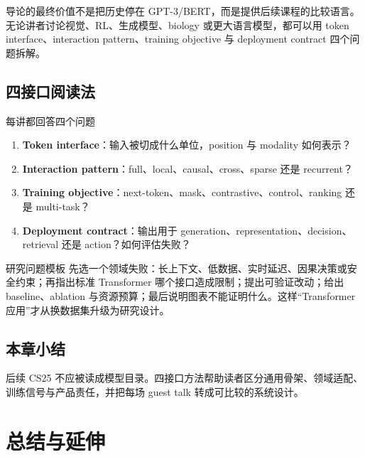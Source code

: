 \documentclass[a4paper]{article}
\begin{document}
导论的最终价值不是把历史停在 GPT-3/BERT，而是提供后续课程的比较语言。无论讲者讨论视觉、RL、生成模型、biology 或更大语言模型，都可以用 token interface、interaction pattern、training objective 与 deployment contract 四个问题拆解。

\subsection{四接口阅读法}

\begin{importantbox}{每讲都回答四个问题}
\begin{enumerate}
  \item \textbf{Token interface}：输入被切成什么单位，position 与 modality 如何表示？
  \item \textbf{Interaction pattern}：full、local、causal、cross、sparse 还是 recurrent？
  \item \textbf{Training objective}：next-token、mask、contrastive、control、ranking 还是 multi-task？
  \item \textbf{Deployment contract}：输出用于 generation、representation、decision、retrieval 还是 action？如何评估失败？
\end{enumerate}
\end{importantbox}


\begin{knowledgebox}{研究问题模板}
先选一个领域失败：长上下文、低数据、实时延迟、因果决策或安全约束；再指出标准 Transformer 哪个接口造成限制；提出可验证改动；给出 baseline、ablation 与资源预算；最后说明图表不能证明什么。这样“Transformer 应用”才从换数据集升级为研究设计。
\end{knowledgebox}

\subsection{本章小结}

后续 CS25 不应被读成模型目录。四接口方法帮助读者区分通用骨架、领域适配、训练信号与产品责任，并把每场 guest talk 转成可比较的系统设计。

\section{总结与延伸}
\end{document}
